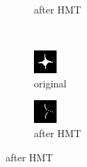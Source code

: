 \documentclass[12pt]{article}
\renewcommand{\subfiguresize}{.25\textwidth}
\begin{document}
\begin{figure}[H]
\begin{subfigure}[t]{\subfiguresize}
        \caption{after HMT}
    \end{subfigure}\\[1em]
    \begin{subfigure}[t]{\subfiguresize}
        \includegraphics[width=\textwidth]{img/image2.png}
        \caption{original}
    \end{subfigure}
    \hspace{2em}
    \begin{subfigure}[t]{\subfiguresize}
        \includegraphics[width=\textwidth]{img/hmt2-left.png}
        \caption{after HMT}
    \end{subfigure}
\end{figure}
\end{document}
